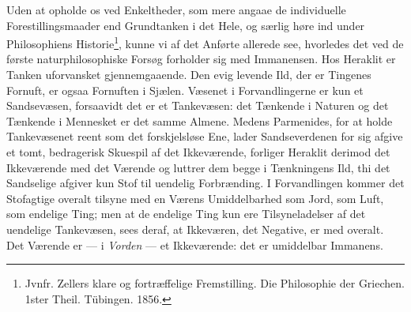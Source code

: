 \documentclass[12pt,a4paper]{book}
\begin{document}
Uden at opholde os ved Enkeltheder, som mere angaae de individuelle
Forestillingsmaader end Grundtanken i det Hele, og særlig høre ind under
Philosophiens Historie\footnote{%
Jvnfr. Zellers klare og fortræffelige Fremstilling. Die Philosophie der
Griechen. 1ster Theil. Tübingen. 1856.}, kunne vi af det Anførte allerede see,
hvorledes det ved de første naturphilosophiske Forsøg forholder sig med
Immanensen. Hos Heraklit er Tanken uforvansket gjennemgaaende. Den evig
levende Ild, der er Tingenes Fornuft, er ogsaa Fornuften i Sjælen. Væsenet i
Forvandlingerne er kun et Sandsevæsen, forsaavidt det er et Tankevæsen: det
Tænkende i Naturen og det Tænkende i Mennesket er det samme Almene. Medens
Parmenides, for at holde Tankevæsenet reent som det forskjelsløse Ene, lader
Sandseverdenen for sig afgive et tomt, bedragerisk Skuespil af det
Ikkeværende, forliger Heraklit derimod det Ikkeværende med det Værende og
luttrer dem begge i Tænkningens Ild, thi det Sandselige afgiver kun Stof til
uendelig Forbrænding. I Forvandlingen kommer det Stofagtige overalt tilsyne
med en Værens Umiddelbarhed som Jord, som Luft, som endelige Ting; men at de
endelige Ting kun ere Tilsyneladelser af det uendelige Tankevæsen, sees deraf,
at Ikkeværen, det Negative, er med overalt. Det Værende er --- i
\emph{Vorden} --- et Ikkeværende: det er umiddelbar Immanens.
\end{document}
